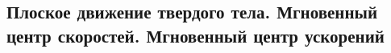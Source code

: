

\subsection{Плоское движение твердого тела. Мгновенный центр скоростей. Мгновенный центр ускорений}



